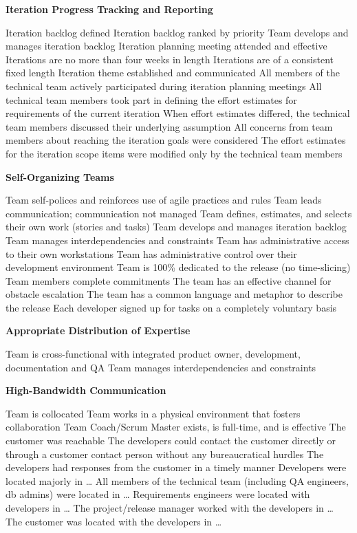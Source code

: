 \textbf{Iteration Progress Tracking and Reporting}
\begin{itemize}
	\taa Iteration backlog defined
	\taa Iteration backlog ranked by priority
	\taa Team develops and manages iteration backlog
	\taa Iteration planning meeting attended and effective
	\taa Iterations are no more than four weeks in length
	\taa Iterations are of a consistent fixed length
	\taa Iteration theme established and communicated 
	\pam All members of the technical team actively participated during iteration planning meetings
	\pam All technical team members took part in defining the effort estimates for 
requirements of the current iteration
	\pamr When effort estimates differed, the technical team members discussed their underlying assumption 
	\pamr All concerns from team members about reaching the iteration goals were  considered 
	\pamr The effort estimates for the iteration scope items were modified only by the  technical team members
\end{itemize}

\textbf{Self-Organizing Teams}
\begin{itemize}
	\taa Team self-polices and reinforces use of agile practices and rules
	\taa Team leads communication; communication not managed
	\taa Team defines, estimates, and selects their own work (stories and tasks)
	\taa Team develops and manages iteration backlog
	\taa Team manages interdependencies and constraints
	\taa Team has administrative access to their own workstations 
	\taa Team has administrative control over their development environment
	\taar Team is 100\% dedicated to the release (no time-slicing) 
	\taar Team members complete commitments 
	\taar The team has an effective channel for obstacle escalation
	\taar The team has a common language and metaphor to describe the release 
	\pam Each developer signed up for tasks on a completely voluntary basis
\end{itemize}

\textbf{Appropriate Distribution of Expertise}
\begin{itemize}
	\taa Team is cross-functional with integrated product owner, development, documentation and QA
	\taa Team manages interdependencies and constraints
\end{itemize}

\textbf{High-Bandwidth Communication}
\begin{itemize}
	\taa Team is collocated
	\taa Team works in a physical environment that fosters collaboration
	\taa Team Coach/Scrum Master exists, is full-time, and is effective 
	\pam The customer was reachable
	\pam The developers could contact the customer directly or through a customer contact person without any bureaucratical hurdles 
	\pam The developers had responses from the customer in a timely manner 
	\pam Developers were located majorly in \ldots
	\pam All members of the technical team (including QA engineers, db admins) were located in \ldots
	\pam Requirements engineers were located with developers in \ldots
	\pam The project/release manager worked with the developers in \ldots
	\pam The customer was located with the developers in \ldots
\end{itemize}

